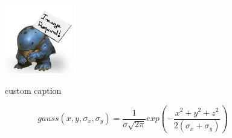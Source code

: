 

\begin{figure}
  \centering
  \includegraphics[height=3cm]{Images/img_required.jpg}
  \label{fig:custom_fig}
  \caption{custom caption}
\end{figure}


\begin{equation}
  gauss(x,y,\sigma_{x},\sigma_{y}) = \frac{1}{ \sigma\sqrt{2\pi} }exp(-\frac{x^2 + y^2 + z^2}{2(\sigma_{x}+ \sigma_{y}) })
\end{equation}